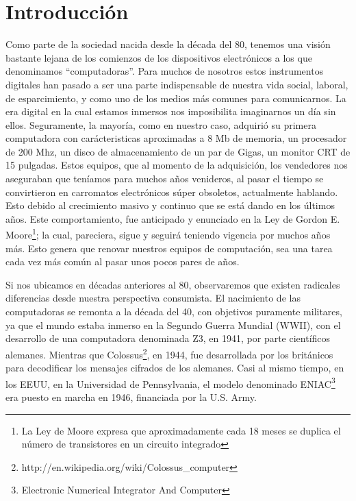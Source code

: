 \documentclass[%
 	final,
%
	notitlepage,
	narroweqnarray,
	inline,
 	twoside,
	]{ieee}
\newcommand{\link}[1]{\textit{}{#1}}
\begin{document}

\section{Introducci\'on}

Como parte de la sociedad nacida desde la d\'ecada del 80, tenemos una visi\'on bastante lejana de los comienzos de los dispositivos electr\'onicos a los que denominamos ``computadoras''. Para muchos de nosotros estos instrumentos digitales han pasado a ser una parte indispensable de nuestra vida social, laboral, de esparcimiento, y como uno de los medios m\'as comunes para comunicarnos. La era digital en la cual estamos inmersos nos imposibilita imaginarnos un d\'ia sin ellos. 
Seguramente, la mayor\'ia, como en nuestro caso, adquiri\'o su primera computadora con car\'acteristicas aproximadas a 8 Mb de memoria, un procesador de 200 Mhz, un disco de almacenamiento de un par de Gigas, un monitor CRT de 15 pulgadas. Estos equipos, que al momento de la adquisici\'on, los vendedores nos aseguraban que ten\'iamos para muchos a\~nos venideros, al pasar el tiempo se convirtieron en carromatos electr\'onicos s\'uper obsoletos, actualmente hablando. Esto debido al crecimiento masivo y continuo que se est\'a dando en los \'ultimos a\~nos.
Este comportamiento, fue anticipado y enunciado en la Ley de Gordon E. Moore\footnote{La Ley de Moore expresa que aproximadamente cada 18 meses se duplica el n\'umero de transistores en un circuito integrado\cite{LeyMoore}}; la cual, pareciera, sigue y seguir\'a teniendo vigencia por muchos a\~nos m\'as. Esto genera que renovar nuestros equipos de computaci\'on, sea una tarea cada vez m\'as com\'un al pasar unos pocos pares de a\~nos.

Si nos ubicamos en d\'ecadas anteriores al 80, observaremos que existen radicales diferencias desde nuestra perspectiva consumista.
El nacimiento de las computadoras se remonta a la d\'ecada del 40, con objetivos puramente militares, ya que el mundo estaba inmerso en la Segundo Guerra Mundial (WWII), con el desarrollo de una computadora denominada Z3\cite{z3}, en 1941, por parte cient\'ificos alemanes. Mientras que Colossus\footnote{\link{http://en.wikipedia.org/wiki/Colossus\_computer}}, en 1944, fue desarrollada por los brit\'anicos para decodificar los mensajes cifrados de los alemanes. Casi al mismo tiempo, en los EEUU, en la Universidad de Pennsylvania, el modelo denominado ENIAC\footnote{Electronic Numerical Integrator And Computer\cite{eniac}} era puesto en marcha en 1946, financiada por la U.S. Army.
\end{document}
